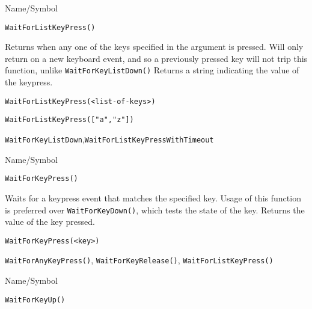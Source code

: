 \begin{desc}{Name/Symbol}
\item[Name/Symbol]  	\verb+WaitForListKeyPress()+

\item[Description] Returns when any one of the keys specified in the
  argument is pressed. Will only return on a new keyboard event, and
  so a previously pressed key will not trip this function, unlike
  \verb+WaitForKeyListDown()+  Returns a string indicating the value
  of the keypress.

\item[Usage]
\begin{verbatim}
WaitForListKeyPress(<list-of-keys>)
\end{verbatim}

\item[Example]     	
\begin{verbatim}
WaitForListKeyPress(["a","z"])
\end{verbatim}

\item[See Also]	
   \verb+WaitForKeyListDown+,\verb+WaitForListKeyPressWithTimeout+
 \end{desc}

\rl


\begin{desc}{Name/Symbol}
\item[Name/Symbol]  	\verb+WaitForKeyPress()+

\item[Description] Waits for a keypress event that matches the
  specified key.  Usage of this function is preferred over
  \verb+WaitForKeyDown()+, which tests the state of the key. Returns the
  value of the key pressed.

\item[Usage]
\begin{verbatim}
WaitForKeyPress(<key>)
\end{verbatim}

\item[Example]	

\item[See Also]     	\verb+WaitForAnyKeyPress()+, \verb+WaitForKeyRelease()+, \verb+WaitForListKeyPress()+
\end{desc}

\rl


\begin{desc}{Name/Symbol}
\item[Name/Symbol] 	\verb+WaitForKeyUp()+

\item[Description]	

\item[Usage]		

\item[Example]	

\item[See Also]	
\end{desc}




